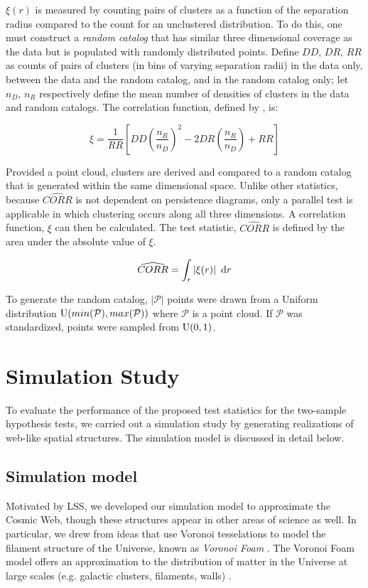 \documentclass[12pt]{article}
\begin{document}
$\xi(r)$ is measured by counting pairs of clusters as a function of the separation radius compared to the count for an unclustered distribution. To do this, one must construct a \textit{random catalog} that has similar three dimensional coverage as the data but is populated with randomly distributed points. Define $DD$, $DR$, $RR$ as counts of pairs of clusters (in bins of varying separation radii) in the data only, between the data and the random catalog, and in the random catalog only; let $n_{D}$, $n_{R}$ respectively define the mean number of densities of clusters in the data and random catalogs. The correlation function, defined by \citep{landy1993bias}, is:

\[ \xi = \frac{1}{RR}\left[DD\left(\frac{n_{R}}{n_{D}}\right)^{2} - 2DR\left(\frac{n_{R}}{n_{D}}\right) + RR\right] \]

Provided a point cloud, clusters are derived and compared to a random catalog that is generated within the same dimensional space. Unlike other statistics, because $\widehat{CORR}$ is not dependent on persistence diagrams, only a parallel test is applicable in which clustering occurs along all three dimensions. A correlation function, $\xi$ can then be calculated. The test statistic, $\widehat{CORR}$ is defined by the area under the absolute value of $\xi$.

\[ \widehat{CORR} = \int_{r} \left | \xi(r) \right | \textup{ d}r \]

To generate the random catalog, $\left | \mathcal P \right |$ points were drawn from a Uniform distribution $\textup{U}(min(\mathcal P), max(\mathcal P))$ where $\mathcal P$ is a point cloud. If $\mathcal P$ was standardized, points were sampled from $\textup{U}(0, 1)$.


\section{Simulation Study}
\label{sec:simulation}

To evaluate the performance of the proposed test statistics for the two-sample hypothesis tests, we carried out a simulation study by generating realizations of web-like spatial structures.  The simulation model is discussed in detail below.

\subsection{Simulation model} \label{sec:sim_model} %
Motivated by LSS, we developed our simulation model to approximate the Cosmic Web, though these structures appear in other areas of science as well.  In particular, we drew from ideas that use Voronoi tesselations to model the filament structure of the Universe, known as \emph{Voronoi Foam} \citep{icke1987fragmenting, icke1991galaxy, van2007voronoi}.  The Voronoi Foam model offers an approximation to the distribution of matter in the Universe at large scales (e.g. galactic clusters, filaments, walls) \citep{icke1991galaxy}.
\end{document}

